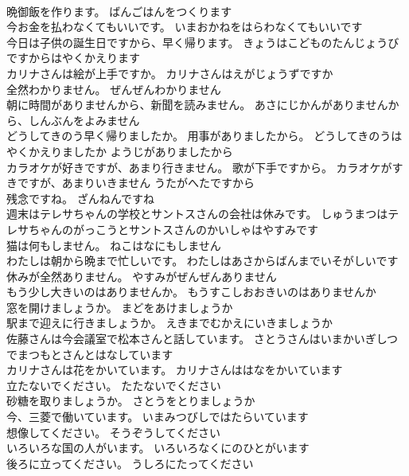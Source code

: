 \documentclass[8pt]{extreport}
\begin{document}
\begin{CJK}{UTF8}{min}
\\	晩御飯を作ります。	ばんごはんをつくります 
\\	今お金を払わなくてもいいです。	いまおかねをはらわなくてもいいです 
\\	今日は子供の誕生日ですから、早く帰ります。	きょうはこどものたんじょうびですからはやくかえります 
\\	カリナさんは絵が上手ですか。	カリナさんはえがじょうずですか 
\\	全然わかりません。	ぜんぜんわかりません 
\\	朝に時間がありませんから、新聞を読みません。	あさにじかんがありませんから、しんぶんをよみません 
\\	どうしてきのう早く帰りましたか。 用事がありましたから。	どうしてきのうはやくかえりましたか ようじがありましたから 
\\	カラオケが好きですが、あまり行きません。 歌が下手ですから。	カラオケがすきですが、あまりいきません うたがへたですから 
\\	残念ですね。	ざんねんですね 
\\	週末はテレサちゃんの学校とサントスさんの会社は休みです。	しゅうまつはテレサちゃんのがっこうとサントスさんのかいしゃはやすみです 
\\	猫は何もしません。	ねこはなにもしません 
\\	わたしは朝から晩まで忙しいです。	わたしはあさからばんまでいそがしいです 
\\	休みが全然ありません。	やすみがぜんぜんありません 
\\	もう少し大きいのはありませんか。	もうすこしおおきいのはありませんか 
\\	窓を開けましょうか。	まどをあけましょうか 
\\	駅まで迎えに行きましょうか。	えきまでむかえにいきましょうか 
\\	佐藤さんは今会議室で松本さんと話しています。	さとうさんはいまかいぎしつでまつもとさんとはなしています 
\\	カリナさんは花をかいています。	カリナさんははなをかいています 
\\	立たないでください。	たたないでください 
\\	砂糖を取りましょうか。	さとうをとりましょうか 
\\	今、三菱で働いています。	いまみつびしではたらいています 
\\	想像してください。	そうぞうしてください 
\\	いろいろな国の人がいます。	いろいろなくにのひとがいます 
\\	後ろに立ってください。	うしろにたってください 

\end{CJK}
\end{document}
